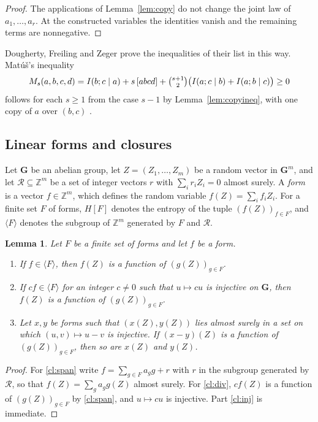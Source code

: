 \documentclass[11pt]{amsart}
\newtheorem{lemma}[theorem]{Lemma}
\theoremstyle{definition}
\theoremstyle{remark}
\numberwithin{equation}{section}
\newcommand{\Z}{\mathbb{Z}}
\newcommand{\GG}{\mathbf{G}}
\begin{document}
\begin{proof}
The applications of Lemma~\ref{lem:copy} do not change the joint law of $a_1,\dots,a_r$. At the constructed variables the identities vanish and the remaining terms are nonnegative.
\end{proof}

Dougherty, Freiling and Zeger prove the inequalities of their list \cite[Section~VIII]{DFZ11} in this way. Mat\'u\v{s}'s inequality
\[
M_s(a,b,c,d)=I(b;c\mid a)+s\,[abcd]+\tbinom{s+1}{2}\bigl(I(a;c\mid b)+I(a;b\mid c)\bigr)\ge0
\]
\cite[Corollary~3, formula~(4)]{Mat07} follows for each $s\ge1$ from the case $s-1$ by Lemma~\ref{lem:copyineq}, with one copy of $a$ over $(b,c)$ \cite[(80) and Rule~{[1]}]{DFZ11}.


\subsection{Linear forms and closures}\label{sec:closure}
Let $\GG$ be an abelian group, let $Z=(Z_1,\dots,Z_m)$ be a random vector in $\GG^m$, and let $\mathcal R\subseteq\Z^m$ be a set of integer vectors $r$ with $\sum_ir_iZ_i=0$ almost surely. A \emph{form} is a vector $f\in\Z^m$, which defines the random variable $f(Z)=\sum_if_iZ_i$. For a finite set $F$ of forms, $H[F]$ denotes the entropy of the tuple $(f(Z))_{f\in F}$, and $\langle F\rangle$ denotes the subgroup of $\Z^m$ generated by $F$ and $\mathcal R$.

\begin{lemma}\label{lem:closure}
Let $F$ be a finite set of forms and let $f$ be a form.
\begin{enumerate}[label=\textup{(\alph*)}]
\item\label{cl:span} If $f\in\langle F\rangle$, then $f(Z)$ is a function of $(g(Z))_{g\in F}$.
\item\label{cl:div} If $cf\in\langle F\rangle$ for an integer $c\ne0$ such that $u\mapsto cu$ is injective on $\GG$, then $f(Z)$ is a function of $(g(Z))_{g\in F}$.
\item\label{cl:inj} Let $x,y$ be forms such that $(x(Z),y(Z))$ lies almost surely in a set on which $(u,v)\mapsto u-v$ is injective. If $(x-y)(Z)$ is a function of $(g(Z))_{g\in F}$, then so are $x(Z)$ and $y(Z)$.
\end{enumerate}
\end{lemma}

\begin{proof}
For \ref{cl:span} write $f=\sum_{g\in F}a_gg+r$ with $r$ in the subgroup generated by $\mathcal R$, so that $f(Z)=\sum_ga_gg(Z)$ almost surely. For \ref{cl:div}, $cf(Z)$ is a function of $(g(Z))_{g\in F}$ by \ref{cl:span}, and $u\mapsto cu$ is injective. Part \ref{cl:inj} is immediate.
\end{proof}
\end{document}
